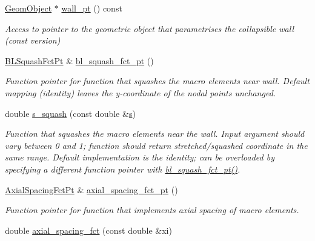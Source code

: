 \begin{DoxyCompactItemize}
\hyperlink{classoomph_1_1GeomObject}{Geom\+Object} $\ast$ \hyperlink{classoomph_1_1CollapsibleChannelDomain_a48237d8c4d10ff3ccdf68d02da5b29c7}{wall\+\_\+pt} () const
\begin{DoxyCompactList}\small\item\em Access to pointer to the geometric object that parametrises the collapsible wall (const version) \end{DoxyCompactList}\item 
\hyperlink{classoomph_1_1CollapsibleChannelDomain_a2bf1d7943bfac134a5c27a54c7e1faed}{B\+L\+Squash\+Fct\+Pt} \& \hyperlink{classoomph_1_1CollapsibleChannelDomain_a9c7def97a2248a8e5a2dca79ee3a54eb}{bl\+\_\+squash\+\_\+fct\+\_\+pt} ()
\begin{DoxyCompactList}\small\item\em Function pointer for function that squashes the macro elements near wall. Default mapping (identity) leaves the y-\/coordinate of the nodal points unchanged. \end{DoxyCompactList}\item 
double \hyperlink{classoomph_1_1CollapsibleChannelDomain_a638fd3959b72ef3287615f2b0f968e33}{s\+\_\+squash} (const double \&\hyperlink{cfortran_8h_ab7123126e4885ef647dd9c6e3807a21c}{s})
\begin{DoxyCompactList}\small\item\em Function that squashes the macro elements near the wall. Input argument should vary between 0 and 1; function should return stretched/squashed coordinate in the same range. Default implementation is the identity; can be overloaded by specifying a different function pointer with \hyperlink{classoomph_1_1CollapsibleChannelDomain_a9c7def97a2248a8e5a2dca79ee3a54eb}{bl\+\_\+squash\+\_\+fct\+\_\+pt()}. \end{DoxyCompactList}\item 
\hyperlink{classoomph_1_1CollapsibleChannelDomain_a317472dab112beac771ecf6442a465f5}{Axial\+Spacing\+Fct\+Pt} \& \hyperlink{classoomph_1_1CollapsibleChannelDomain_a17bfb9fe218dc539669bdbdf0ecc4bf8}{axial\+\_\+spacing\+\_\+fct\+\_\+pt} ()
\begin{DoxyCompactList}\small\item\em Function pointer for function that implements axial spacing of macro elements. \end{DoxyCompactList}\item 
double \hyperlink{classoomph_1_1CollapsibleChannelDomain_abc7b20efd68bdd11f1bea5df79ae579d}{axial\+\_\+spacing\+\_\+fct} (const double \&xi)

\end{DoxyCompactItemize}
